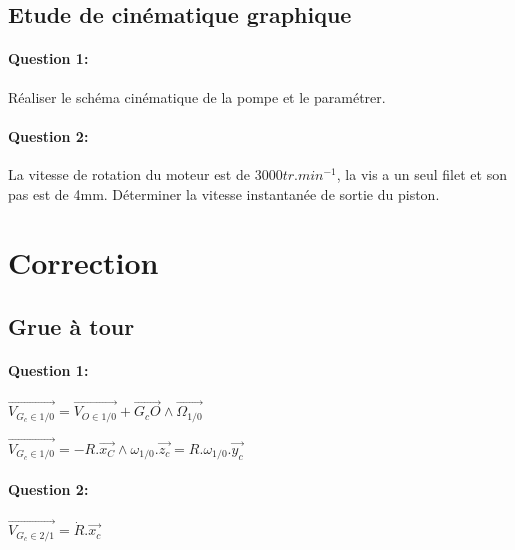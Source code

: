 \subsection{Etude de cinématique graphique}

\paragraph{Question 1:}

Réaliser le schéma cinématique de la pompe et le paramétrer.

\paragraph{Question 2:}

La vitesse de rotation du moteur est de $3000 tr.min^{-1}$, la vis a un seul filet et son pas est de 4mm. Déterminer la vitesse instantanée de sortie du piston.

 

\clearpage

\ifdef{\public}{}{}

\pagestyle{correction}

\newpage

\section{Correction}

\subsection{Grue à tour}

\paragraph{Question 1:} 

$\overrightarrow{V_{G_c\in 1/0}}=\overrightarrow{V_{O\in 1/0}}+\overrightarrow{G_cO}\wedge \overrightarrow{\Omega_{1/0}}$

$\overrightarrow{V_{G_c\in 1/0}}=-R.\overrightarrow{x_C}\wedge \omega_{1/0}.\overrightarrow{z_c}=R.\omega_{1/0}.\overrightarrow{y_c}$

\paragraph{Question 2:} 

$\overrightarrow{V_{G_c\in 2/1}}=\dot{R}.\overrightarrow{x_c}$

